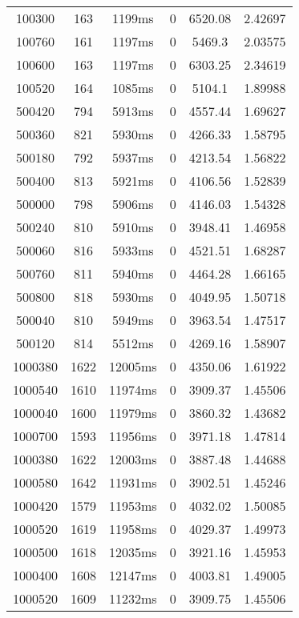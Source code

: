 \documentclass[./main.tex]{subfiles}
\begin{document}
\begin{table}
\begin{tabular}{ c | c | c | c | c | c }
        100300 & 163 & 1199ms & 0 & 6520.08 & 2.42697 \\
        100760 & 161 & 1197ms & 0 & 5469.3 & 2.03575 \\
        100600 & 163 & 1197ms & 0 & 6303.25 & 2.34619 \\
        100520 & 164 & 1085ms & 0 & 5104.1 & 1.89988 \\
        \hline
        500420 & 794 & 5913ms & 0 & 4557.44 & 1.69627 \\
        500360 & 821 & 5930ms & 0 & 4266.33 & 1.58795 \\
        \rowcolor{lightgray} 500180 & 792 & 5937ms & 0 & 4213.54 & 1.56822 \\
        500400 & 813 & 5921ms & 0 & 4106.56 & 1.52839 \\
        500000 & 798 & 5906ms & 0 & 4146.03 & 1.54328 \\
        500240 & 810 & 5910ms & 0 & 3948.41 & 1.46958 \\
        500060 & 816 & 5933ms & 0 & 4521.51 & 1.68287 \\
        500760 & 811 & 5940ms & 0 & 4464.28 & 1.66165 \\
        500800 & 818 & 5930ms & 0 & 4049.95 & 1.50718 \\
        500040 & 810 & 5949ms & 0 & 3963.54 & 1.47517 \\
        500120 & 814 & 5512ms & 0 & 4269.16 & 1.58907 \\
        \hline
        1000380 & 1622 & 12005ms & 0 & 4350.06 & 1.61922 \\
        1000540 & 1610 & 11974ms & 0 & 3909.37 & 1.45506 \\
        1000040 & 1600 & 11979ms & 0 & 3860.32 & 1.43682 \\
        1000700 & 1593 & 11956ms & 0 & 3971.18 & 1.47814 \\
        1000380 & 1622 & 12003ms & 0 & 3887.48 & 1.44688 \\
        1000580 & 1642 & 11931ms & 0 & 3902.51 & 1.45246 \\
        1000420 & 1579 & 11953ms & 0 & 4032.02 & 1.50085 \\
        1000520 & 1619 & 11958ms & 0 & 4029.37 & 1.49973 \\
        \rowcolor{lightgray} 1000500 & 1618 & 12035ms & 0 & 3921.16 & 1.45953 \\
        1000400 & 1608 & 12147ms & 0 & 4003.81 & 1.49005 \\
        1000520 & 1609 & 11232ms & 0 & 3909.75 & 1.45506 \\

\end{tabular}
\end{table}
\end{document}
